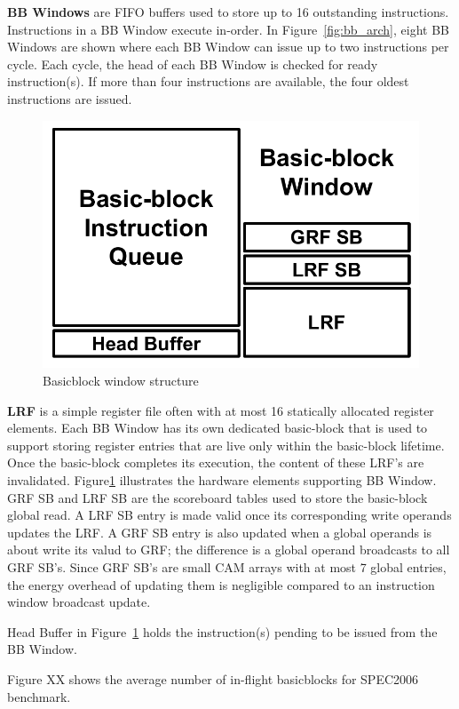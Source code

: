 \label{sec:bb_window}

\textbf{BB Windows} are FIFO buffers used to store up to 16 outstanding
instructions.  Instructions in a BB Window execute in-order. In
Figure~\ref{fig:bb_arch}, eight BB Windows are shown where each BB Window can
issue up to two instructions per cycle. Each cycle, the head of each BB Window
is checked for ready instruction(s). If more than four instructions are
available, the four oldest instructions are issued. 

\begin{figure}
	\centering
	\includegraphics[width=0.6\columnwidth]{fig/bb_window.pdf} 
	\caption{Basicblock window structure}
	\label{fig:bb_window}
\end{figure}

\textbf{LRF} is a simple register file often with at most 16 statically
allocated register elements. Each BB Window has its own dedicated basic-block
that is used to support storing register entries that are live only within the
basic-block lifetime. Once the basic-block completes its execution, the content
of these LRF's are invalidated. Figure\ref{fig:bb_window} illustrates the hardware
elements supporting BB Window. GRF SB and LRF SB are the scoreboard tables used
to store the basic-block global read. A LRF SB entry is made valid once its
corresponding write operands updates the LRF. A GRF SB entry is also updated
when a global operands is about write its valud to GRF; the difference is a
global operand broadcasts to all GRF SB's. Since GRF SB's are small CAM arrays
with at most 7 global entries, the energy overhead of updating them is
negligible compared to an instruction window broadcast update.

Head Buffer in Figure~\ref{fig:bb_window} holds the instruction(s) pending to be
issued from the BB Window.

Figure XX shows the average number of in-flight basicblocks for SPEC2006
benchmark.




